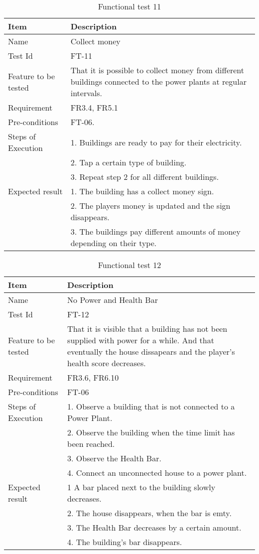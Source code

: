 \begin{table}[H]
\centering
	\begin{tabular}{ l | p{8cm} }
		\hline
		{\bf Item} & {\bf Description} \\ \hline
		Name & Collect money \\ 
		Test Id & FT-11 \\ 
		Feature to be tested & That it is possible to collect money from different buildings connected to the power plants at regular intervals. \\
		Requirement & FR3.4, FR5.1 \\ 
		Pre-conditions & FT-06. \\ 
		Steps of Execution & 1. Buildings are ready to pay for their electricity. \\
		& 2. Tap a certain type of building. \\ 
		& 3. Repeat step 2 for all different buildings. \\
		Expected result & 1. The building has a collect money sign. \\
		& 2. The players money is updated and the sign disappears. \\
		& 3. The buildings pay different amounts of money depending on their type. \\
	\end{tabular}
	\caption{Functional test 11}
\end{table}

\begin{table}[H]
\centering
	\begin{tabular}{ l | p{8cm} }
		\hline
		{\bf Item} & {\bf Description} \\ \hline
		Name & No Power and Health Bar \\ 
		Test Id & FT-12 \\ 
		Feature to be tested & That it is visible that a building has not been supplied with power for a while. And that eventually the house dissapears and the player's health score decreases. \\
		Requirement & FR3.6, FR6.10 \\ 
		Pre-conditions & FT-06 \\ 
		Steps of Execution &  1. Observe a building that is not connected to a Power Plant. \\ 
		& 2. Observe the building when the time limit has been reached. \\
		& 3. Observe the Health Bar. \\
		& 4. Connect an unconnected house to a power plant. \\
		Expected result & 1 A bar placed next to the building slowly decreases. \\
		& 2. The house disappears, when the bar is emty. \\
		& 3. The Health Bar decreases by a certain amount. \\
		& 4. The building's bar disappears. \\
	\end{tabular}
	\caption{Functional test 12}
\end{table}

